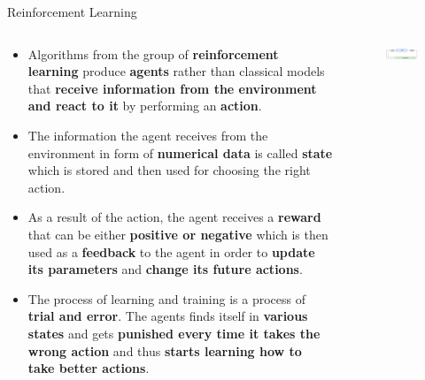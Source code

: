 \documentclass[document.tex]{subfiles}
\begin{document}
    \begin{frame}{Reinforcement Learning}
        \begin{columns}
            \begin{column}{.6\textwidth}
                \begin{itemize}
                    \item Algorithms from the group of \textbf{reinforcement learning} produce \textbf{agents} rather than classical models that \textbf{receive information from the environment and react to it} by performing an \textbf{action}.
                    \item The information the agent receives from the environment in form of \textbf{numerical data} is called \textbf{state} which is stored and then used for choosing the right action.
                    \item As a result of the action, the agent receives a \textbf{reward} that can be either \textbf{positive or negative} which is then used as a \textbf{feedback} to the agent in order to \textbf{update its parameters} and \textbf{change its future actions}.
                    \item The process of learning and training is a process of \textbf{trial and error}. The agents finds itself in \textbf{various states} and gets\textbf{ punished every time it takes the wrong action} and thus \textbf{starts learning how to take better actions}.
                \end{itemize}
            \end{column}
            \begin{column}{.4\textwidth}
                \begin{figure}
                    \label{fig:reinforcement-learning}
                    \includegraphics[width=\textwidth]{figures/drawio/reinforcement-learning.png}
                \end{figure}
            \end{column}
        \end{columns}
    \end{frame}
\end{document}
